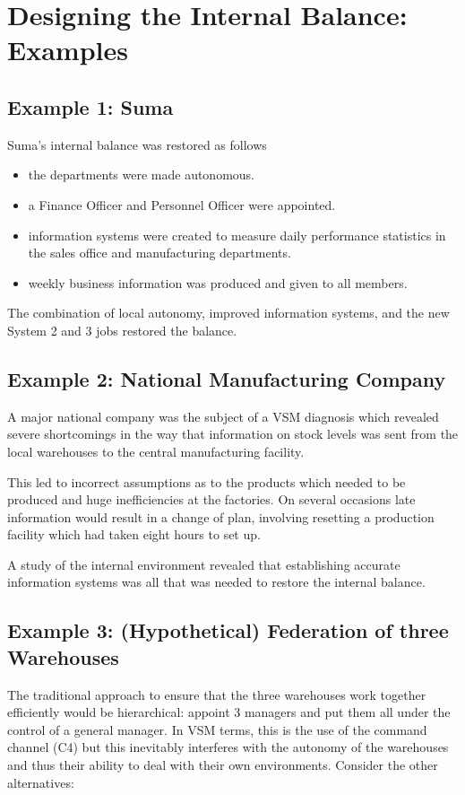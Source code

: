 \section*{Designing the Internal Balance: Examples}

\subsection*{Example 1: Suma}
Suma's internal balance was restored as follows

\begin{itemize}
  \item the departments were made autonomous.

  \item a Finance Officer and Personnel Officer were appointed.

  \item information systems were created to measure daily performance statistics in the sales office and manufacturing departments.

  \item weekly business information was produced and given to all members.

\end{itemize}

The combination of local autonomy, improved information systems, and the new System 2 and 3 jobs restored the balance.

\subsection*{Example 2: National Manufacturing Company}
A major national company was the subject of a VSM diagnosis which revealed severe shortcomings in the way that information on stock levels was sent from the local warehouses to the central manufacturing facility.

This led to incorrect assumptions as to the products which needed to be produced and huge inefficiencies at the factories. On several occasions late information would result in a change of plan, involving resetting a production facility which had taken eight hours to set up.

A study of the internal environment revealed that establishing accurate information systems was all that was needed to restore the internal balance.

\subsection*{Example 3: (Hypothetical) Federation of three Warehouses}
The traditional approach to ensure that the three warehouses work together efficiently would be hierarchical: appoint 3 managers and put them all under the control of a general manager. In VSM terms, this is the use of the command channel (C4) but this inevitably interferes with the autonomy of the warehouses and thus their ability to deal with their own environments. Consider the other alternatives:

